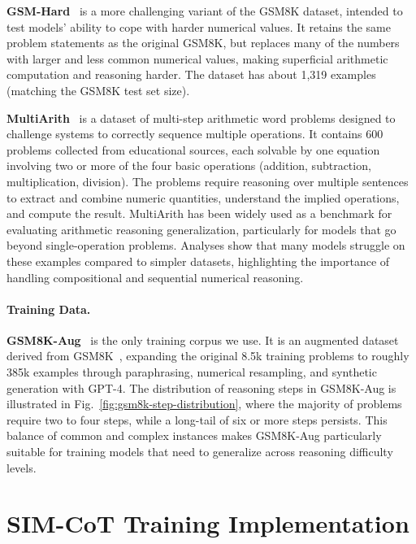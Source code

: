 \textbf{GSM-Hard}~\citep{gao2022pal} is a more challenging variant of the GSM8K dataset, intended to test models’ ability to cope with harder numerical values. It retains the same problem statements as the original GSM8K, but replaces many of the numbers with larger and less common numerical values, making superficial arithmetic computation and reasoning harder. The dataset has about 1,319 examples (matching the GSM8K test set size).

\textbf{MultiArith}~\citep{roy2016solvinggeneralarithmeticword} is a dataset of multi-step arithmetic word problems designed to challenge systems to correctly sequence multiple operations. It contains 600 problems collected from educational sources, each solvable by one equation involving two or more of the four basic operations (addition, subtraction, multiplication, division). The problems require reasoning over multiple sentences to extract and combine numeric quantities, understand the implied operations, and compute the result. MultiArith has been widely used as a benchmark for evaluating arithmetic reasoning generalization, particularly for models that go beyond single-operation problems. Analyses show that many models struggle on these examples compared to simpler datasets, highlighting the importance of handling compositional and sequential numerical reasoning.

\paragraph{Training Data.}
\label{app:training_data}

\textbf{GSM8K-Aug}~\citep{icot} is the only training corpus we use. It is an augmented dataset derived from GSM8K~\citep{cobbe2021trainingverifierssolvemath}, expanding the original 8.5k training problems to roughly 385k examples through paraphrasing, numerical resampling, and synthetic generation with GPT-4. The distribution of reasoning steps in GSM8K-Aug is illustrated in Fig.~\ref{fig:gsm8k-step-distribution}, where the majority of problems require two to four steps, while a long-tail of six or more steps persists. This balance of common and complex instances makes GSM8K-Aug particularly suitable for training models that need to generalize across reasoning difficulty levels.

\section{SIM-CoT Training Implementation}
\label{appendix:simcot}

